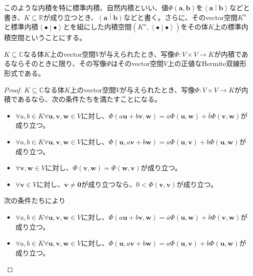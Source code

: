 \documentclass[dvipdfmx]{jsarticle}
\begin{document}
このような内積を特に標準内積、自然内積といい、値$\varPhi\left( \mathbf{a},\mathbf{b} \right)$を$\left\langle \mathbf{a} \middle| \mathbf{b} \right\rangle$などと書き、$K \subseteq \mathbb{R}$が成り立つとき、$\left( \mathbf{a} \middle| \mathbf{b} \right)$などと書く。さらに、そのvector空間$K^{n}$と標準内積$\left\langle \bullet \middle| \bullet \right\rangle$とを組にした内積空間$\left( K^{n},\left\langle \bullet \middle| \bullet \right\rangle \right)$をその体$K$上の標準内積空間ということにする。
\begin{thm}\label{2.3.6.1}
$K \subseteq \mathbb{C}$なる体$K$上のvector空間$V$が与えられたとき、写像$\varPhi:V \times V \rightarrow K$が内積であるならそのときに限り、その写像$\varPhi $はそのvector空間$V$上の正値なHermite双線形形式である。
\end{thm}
\begin{proof}
$K \subseteq \mathbb{C}$なる体$K$上のvector空間$V$が与えられたとき、写像$\varPhi:V \times V \rightarrow K$が内積であるなら、次の条件たちを満たすことになる。
\begin{itemize}
\item
  $\forall a,b \in K\forall\mathbf{u},\mathbf{v},\mathbf{w} \in V$に対し、$\varPhi\left( a\mathbf{u} + b\mathbf{v},\mathbf{w} \right) = \overline{a}\varPhi\left( \mathbf{u},\mathbf{w} \right) + \overline{b}\varPhi\left( \mathbf{v},\mathbf{w} \right)$が成り立つ。
\item
  $\forall a,b \in K\forall\mathbf{u},\mathbf{v},\mathbf{w} \in V$に対し、$\varPhi\left( \mathbf{u},a\mathbf{v} + b\mathbf{w} \right) = a\varPhi\left( \mathbf{u},\mathbf{v} \right) + b\varPhi\left( \mathbf{u},\mathbf{w} \right)$が成り立つ。
\item
  $\forall\mathbf{v},\mathbf{w} \in V$に対し、$\varPhi\left( \mathbf{v},\mathbf{w} \right) = \overline{\varPhi\left( \mathbf{w},\mathbf{v} \right)}$が成り立つ。
\item
  $\forall\mathbf{v} \in V$に対し、$\mathbf{v} \neq \mathbf{0}$が成り立つなら、$0 < \varPhi\left( \mathbf{v},\mathbf{v} \right)$が成り立つ。
\end{itemize}
次の条件たちにより
\begin{itemize}
\item
  $\forall a,b \in K\forall\mathbf{u},\mathbf{v},\mathbf{w} \in V$に対し、$\varPhi\left( a\mathbf{u} + b\mathbf{v},\mathbf{w} \right) = \overline{a}\varPhi\left( \mathbf{u},\mathbf{w} \right) + \overline{b}\varPhi\left( \mathbf{v},\mathbf{w} \right)$が成り立つ。
\item
  $\forall a,b \in K\forall\mathbf{u},\mathbf{v},\mathbf{w} \in V$に対し、$\varPhi\left( \mathbf{u},a\mathbf{v} + b\mathbf{w} \right) = a\varPhi\left( \mathbf{u},\mathbf{v} \right) + b\varPhi\left( \mathbf{u},\mathbf{w} \right)$が成り立つ。

\end{itemize}
\end{proof}
\end{document}
